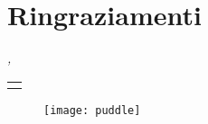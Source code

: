 
\cleardoublepage
{}
{}

\chapter*{Ringraziamenti}
%
	{}
\thispagestyle{empty}



\vspace{5pt}

\lipsum[1]

\bigskip
 
\noindent\textit{\myLocation, \MakeTextLowercase{\myTime}}

\smallskip
\vspace*{-20pt}

\begin{flushright}
	\begin{tabular}{m{5cm}}
		\\ \hline
		\centering\myName \\
	\end{tabular}
\end{flushright}

\pagebreak

\vfill

\begin{figure}
	\centering
	\texttt{[image: puddle]}
\end{figure}

\vfill

